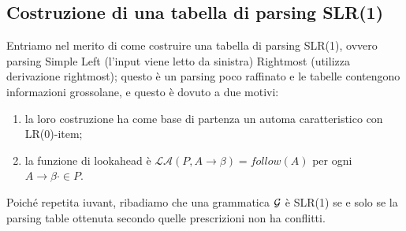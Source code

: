 \documentclass[class=book, crop=false, oneside, 12pt]{standalone}
\begin{document}
\subsection{Costruzione di una tabella di parsing SLR(1)}
Entriamo nel merito di come costruire una tabella di parsing SLR(1), ovvero parsing Simple Left (l'input viene letto da sinistra) Rightmost (utilizza derivazione rightmost); questo è un parsing poco raffinato e le tabelle contengono informazioni grossolane, e questo è dovuto a due motivi:
\begin{enumerate}
    \item la loro costruzione ha come base di partenza un automa caratteristico con LR(0)-item;
    \item la funzione di lookahead è \(\mathcal{LA}(P, A \rightarrow \beta) = follow(A)\) per ogni \(A \rightarrow \beta \cdot \in P\).
\end{enumerate}
Poiché repetita iuvant, ribadiamo che una grammatica \(\mathcal{G}\) è SLR(1) se e solo se la parsing table ottenuta secondo quelle prescrizioni non ha conflitti.
\end{document}
